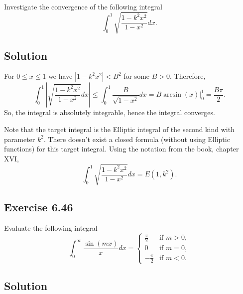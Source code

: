 Investigate the convergence of the following integral
\begin{equation*}
    \int_0^1 \sqrt{\frac{1 - k^2 x^2}{1 - x^2}} dx.
\end{equation*}

\subsection*{Solution}

For $0 \leq x \leq 1$ we have $|1 - k^2 x^2| < B^2$ for some $B > 0$.
Therefore,
\begin{equation*}
    \int_0^1 \left| \sqrt{\frac{1 - k^2 x^2}{1 - x^2}} dx \right|
        \leq \int_0^1 \frac{B}{\sqrt{1 - x^2}} dx
        = B \left. \arcsin(x) \right|_0^1
        = \frac{B \pi}{2}.
\end{equation*}
So, the integral is absolutely integrable, hence the integral converges.

Note that the target integral is the Elliptic integral of the second kind with parameter $k^2$.
There doesn't exist a closed formula (without using Elliptic functions) for this target integral.
Using the notation from the book, chapter XVI,
\begin{equation*}
    \int_0^1 \sqrt{\frac{1 - k^2 x^2}{1 - x^2}} dx = E(1, k^2).
\end{equation*}


\subsection*{Exercise 6.46}

Evaluate the following integral
\begin{equation*}
    \int_0^{\infty} \frac{\sin(mx)}{x} dx = \begin{cases}
        \frac{\pi}{2} & \text{if } m > 0, \\
        0 & \text{if } m = 0, \\
        -\frac{\pi}{2} & \text{if } m < 0.
    \end{cases}
\end{equation*}

\subsection*{Solution}

